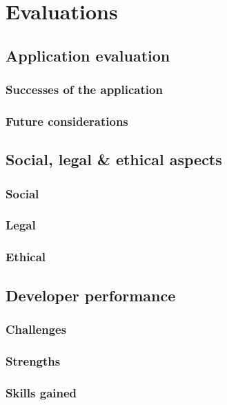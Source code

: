 \section{Evaluations}


\subsection{Application evaluation}

\subsubsection{Successes of the application}

\subsubsection{Future considerations}


\subsection{Social, legal \& ethical aspects}

\subsubsection{Social}

\subsubsection{Legal}

\subsubsection{Ethical}




\subsection{Developer performance}

\subsubsection{Challenges}

\subsubsection{Strengths}

\subsubsection{Skills gained}